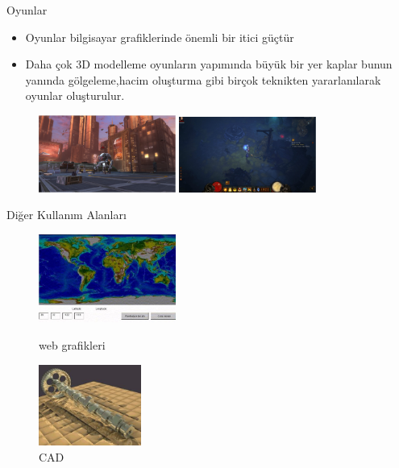 \documentclass{beamer}
\begin{document}
\begin{frame}{Oyunlar}
\begin{itemize}
    \item Oyunlar bilgisayar grafiklerinde önemli bir itici güçtür
    \item Daha çok 3D modelleme oyunların yapımında büyük bir yer kaplar bunun yanında gölgeleme,hacim oluşturma gibi birçok teknikten yararlanılarak oyunlar oluşturulur.
\end{itemize}

\begin{figure}
\includegraphics[width=0.4\textwidth]{oyunlar.PNG}
\includegraphics[width=0.4\textwidth]{Diablo3.PNG}
\caption{}
\end{figure}
\end{frame}

\begin{frame}{Diğer Kullanım Alanları}
\begin{figure}
\includegraphics[width=0.4\textwidth]{WebGrafikleri.jpg}
\caption{web grafikleri}
\includegraphics[width=0.3\textwidth]{CAD.jpg}
\caption{CAD}
\end{figure}
\end{frame}
\end{document}
